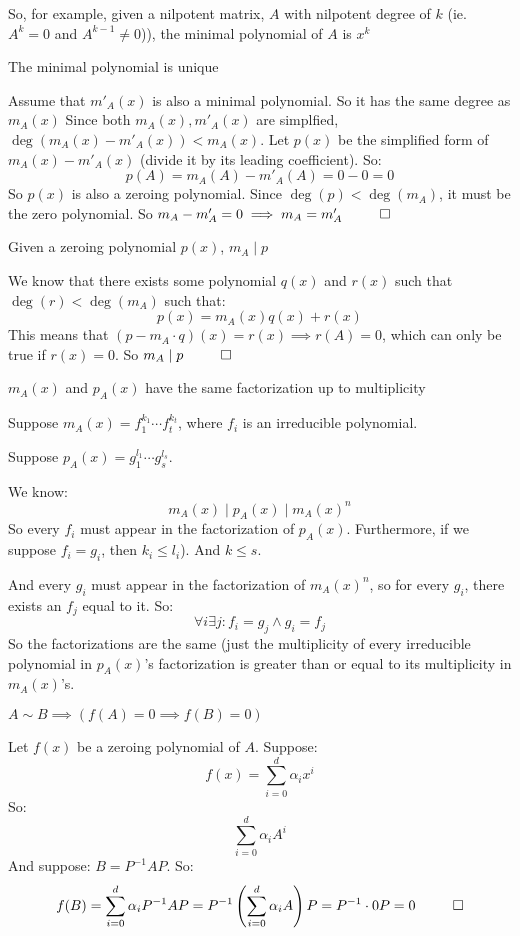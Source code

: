 \documentclass[10pt]{article}
\begin{document}
So, for example, given a nilpotent matrix, $A$ with nilpotent degree of $k$ (ie. $A^k=0$ and $A^{k-1}\neq0$)), the minimal polynomial of $A$ is $x^k$

\newpage
\begin{lemma}{The minimal polynomial is unique}

Assume that $m'_A(x)$ is also a minimal polynomial. So it has the same degree as $m_A(x)$ Since both $m_A(x), m'_A(x)$ are simplfied, $\deg(m_A(x)-m'_A(x))<m_A(x)$. Let $p(x)$ be the simplified form of $m_A(x)-m'_A(x)$ (divide it by its leading coefficient). So:
\[ p(A) = m_A(A)-m'_A(A) = 0 - 0 = 0 \]
So $p(x)$ is also a zeroing polynomial. Since $\deg(p)<\deg(m_A)$, it must be the zero polynomial. So $m_A-m'_A=0\implies m_A=m'_A~~\qed$

\end{lemma}

\begin{lemma}{Given a zeroing polynomial $p(x)$, $m_A\mid p$}

We know that there exists some polynomial $q(x)$ and $r(x)$ such that $\deg(r)<\deg(m_A)$ such that:
\[ p(x) = m_A(x)q(x) + r(x) \]
This means that $(p-m_A\cdot q)(x) = r(x) \implies r(A)=0$, which can only be true if $r(x)=0$. So $m_A \mid p ~~\qed$

\end{lemma}

\begin{theorem}{$m_A(x)$ and $p_A(x)$ have the same factorization up to multiplicity}

Suppose $m_A(x)=f_1^{k_1}\cdots f_t^{k_t}$, where $f_i$ is an irreducible polynomial.

Suppose $p_A(x)=g_1^{l_1}\cdots g_s^{l_s}$.

We know:
\[ m_A(x)\mid p_A(x) \mid m_A(x)^n \]
So every $f_i$ must appear in the factorization of $p_A(x)$. Furthermore, if we suppose $f_i=g_i$, then $k_i\leq l_i$). And $k\leq s$. 

And every $g_i$ must appear in the factorization of $m_A(x)^n$, so for every $g_i$, there exists an $f_j$ equal to it. So:
\[ \forall i \exists j: f_i = g_j \land g_i = f_j \]
So the factorizations are the same (just the multiplicity of every irreducible polynomial in $p_A(x)$'s factorization is greater than or equal to its multiplicity in $m_A(x)$'s.

\end{theorem}

\begin{lemma}[simZero]{$A\sim B \implies (f(A)=0\implies f(B)=0)$}

Let $f(x)$ be a zeroing polynomial of $A$. Suppose:
\[ f(x) = \sum_{i=0}^d \alpha_i x^i \]
So:
\[ \sum_{i=0}^d \alpha_i A^i \]
And suppose:
$B = P^{-1}AP$. So:
\[ f(B) = \sum_{i=0}^d \alpha_i P^{-1}AP = P^{-1}\left(\sum_{i=0}^d \alpha_i A\right)P = P^{-1}\cdot0P = 0 ~~ \qed \]

\end{lemma}
\end{document}
